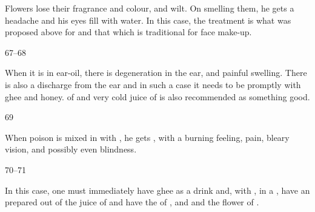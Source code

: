 \begin{translation}
Flowers lose their fragrance and colour, and wilt. On smelling them, he gets a
headache and his eyes fill with water.  In this case, the treatment is what was
proposed above for  and that which is traditional for face
make-up.

\item[67--68]

When it is in ear-oil, there is  degeneration in the ear, and painful swelling.
There is also a discharge from the ear and in such a case it needs to be
 promptly with ghee and honey.  
 of  and  very cold juice of
 is also  recommended as 
something good.


\item[69]

\newcommand{\plant}[4]{\se{#2}{#1}}


When poison is mixed in with , he gets
, with a burning feeling, pain, bleary vision, and
possibly even blindness.

\item[70--71]

In this case, one must immediately have ghee as a drink and,
with
,
in a , 
have an  prepared out of the juice of
and have the  of 
,
and 
and the flower of 
.


\end{translation}
